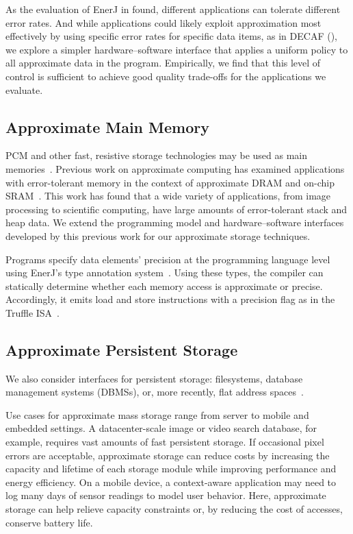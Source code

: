As the evaluation of EnerJ in  found, different applications can
tolerate different error rates.
And while applications could likely exploit approximation most effectively
by using specific error rates for specific data items, as in DECAF
(), we explore a simpler hardware--software interface
that applies a
uniform policy to all approximate data in the program.
Empirically, we find
that this level of control is sufficient to achieve good quality trade-offs for
the applications we evaluate.

\subsection{Approximate Main Memory}

PCM and other fast, resistive storage technologies may be used 
as main memories~\cite{pcm-dram-alt,durable-pcm-mm,qureshi-pcm-mm}.
Previous work on approximate computing has examined applications with
error-tolerant memory in the context of approximate DRAM and
on-chip SRAM~\cite{flikker,enerj,truffle}. This work has found that
a wide variety of applications, from image processing to scientific
computing, have large amounts of error-tolerant stack and heap data.
We extend the programming model and hardware--software interfaces
developed by this previous work for our approximate storage
techniques.

Programs specify data elements' precision at the programming language level using EnerJ's
type annotation system~\cite{enerj}.
Using these types, the compiler
can statically determine whether each memory access is approximate or
precise. Accordingly, it emits load and store instructions with a
precision flag as in the Truffle ISA~\cite{truffle}.

\subsection{Approximate Persistent Storage}

We also consider interfaces for persistent storage:
filesystems, database management systems (DBMSs),
or, more recently, flat address spaces~\cite{nvheaps,mnemosyne}.

Use cases
for approximate mass storage range from server to mobile and embedded
settings. A datacenter-scale image or video search database, for example,
requires vast amounts of fast persistent storage. If occasional
pixel errors are acceptable, approximate storage can reduce costs by
increasing the capacity and lifetime of each storage module while improving
performance and energy efficiency. On a mobile device, a
context-aware application may need to log many days of sensor readings to
model user behavior. Here, approximate storage can help relieve capacity
constraints or, by reducing the cost of accesses,
conserve battery life.

